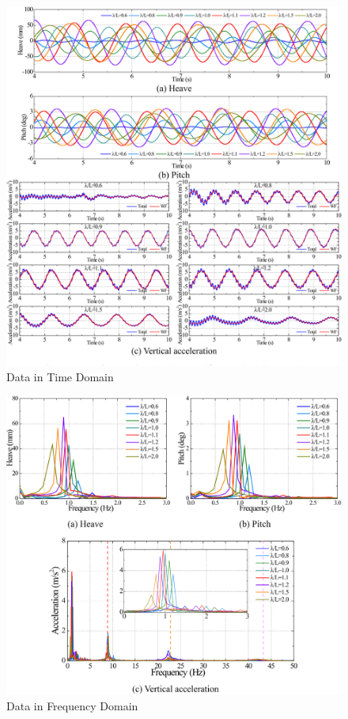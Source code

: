 \documentclass[12pt]{article} %
\begin{document}
\begin{figure}[ht]
    \centering
    \includegraphics[width=1\textwidth]{HPV.png}
    \caption{Data in Time Domain\cite{4}}
\end{figure}
\begin{figure}[ht]
    \centering
    \includegraphics[width=1\textwidth]{FD.png}
    \caption{Data in Frequency Domain\cite{4}}
\end{figure}
\end{document}
